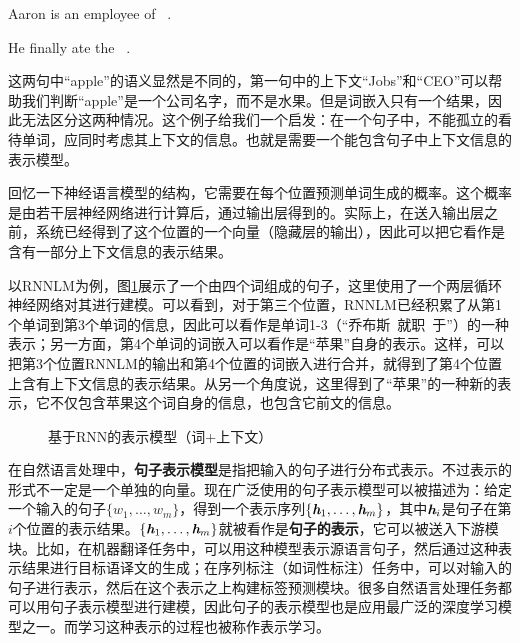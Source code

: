\begin{example}
Aaron is an employee of {}\ .

\hspace{2em} He finally ate the {}\ .
\end{example}

\parinterval  这两句中“apple”的语义显然是不同的，第一句中的上下文“Jobs”和“CEO”可以帮助我们判断“apple”是一个公司名字，而不是水果。但是词嵌入只有一个结果，因此无法区分这两种情况。这个例子给我们一个启发：在一个句子中，不能孤立的看待单词，应同时考虑其上下文的信息。也就是需要一个能包含句子中上下文信息的表示模型。

\parinterval  回忆一下神经语言模型的结构，它需要在每个位置预测单词生成的概率。这个概率是由若干层神经网络进行计算后，通过输出层得到的。实际上，在送入输出层之前，系统已经得到了这个位置的一个向量（隐藏层的输出），因此可以把它看作是含有一部分上下文信息的表示结果。

\parinterval  以RNNLM为例，图\ref{fig:9-68}展示了一个由四个词组成的句子，这里使用了一个两层循环神经网络对其进行建模。可以看到，对于第三个位置，RNNLM已经积累了从第1个单词到第3个单词的信息，因此可以看作是单词1-3（“乔布斯\ 就职\ 于”）的一种表示；另一方面，第4个单词的词嵌入可以看作是“苹果”自身的表示。这样，可以把第3个位置RNNLM的输出和第4个位置的词嵌入进行合并，就得到了第4个位置上含有上下文信息的表示结果。从另一个角度说，这里得到了“苹果”的一种新的表示，它不仅包含苹果这个词自身的信息，也包含它前文的信息。

\begin{figure}[htp]
\centering

\caption{基于RNN的表示模型（词+上下文）}
\label{fig:9-68}
\end{figure}

\parinterval  在自然语言处理中，{\small\sffamily\bfseries{句子表示模型}}是指把输入的句子进行分布式表示。不过表示的形式不一定是一个单独的向量。现在广泛使用的句子表示模型可以被描述为：给定一个输入的句子$ \{ w_1,\dots ,w_m\} $，得到一个表示序列$ \{{\textbf{\em h}}_1,\dots ,{\textbf{\em h}}_m\} $，其中$ {\textbf{\em h}}_i $是句子在第$ i $个位置的表示结果。$ \{ {\textbf{\em h}}_1,\dots ,{\textbf{\em h}}_m\} $就被看作是{\small\sffamily\bfseries{句子的表示}}，它可以被送入下游模块。比如，在机器翻译任务中，可以用这种模型表示源语言句子，然后通过这种表示结果进行目标语译文的生成；在序列标注（如词性标注）任务中，可以对输入的句子进行表示，然后在这个表示之上构建标签预测模块。很多自然语言处理任务都可以用句子表示模型进行建模，因此句子的表示模型也是应用最广泛的深度学习模型之一。而学习这种表示的过程也被称作表示学习。

